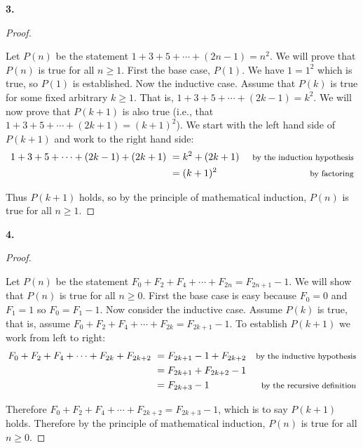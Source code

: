 \documentclass[10pt,]{book}
\theoremstyle{plain}
\theoremstyle{definition}
\theoremstyle{definition}
\theoremstyle{definition}
\numberwithin{equation}{chapter}
\newcommand{\amp}{ & }
\begin{document}
\par\smallskip
\noindent\textbf{3.}\quad{}\begin{proof}\hypertarget{proof-21}{}

Let \(P(n)\) be the statement \(1+3 +5 + \cdots + (2n-1) = n^2\). We will prove that \(P(n)\) is true for all \(n \ge 1\). First the base case, \(P(1)\). We have \(1 = 1^2\) which is true, so \(P(1)\) is established. Now the inductive case. Assume that \(P(k)\) is true for some fixed arbitrary \(k \ge 1\). That is, \(1 + 3 + 5 + \cdots + (2k-1) = k^2\). We will now prove that \(P(k+1)\) is also true (i.e., that \(1 + 3 + 5 + \cdots + (2k+1) = (k+1)^2\)). We start with the left hand side of \(P(k+1)\) and work to the right hand side:
\begin{align*}
  1 + 3 + 5 + \cdots + (2k-1) + (2k+1) ~ \amp  = k^2 + (2k+1) \amp  \mbox{ \footnotesize by the induction hypothesis}\\
  \amp  = (k+1)^2 \amp  \mbox{ \footnotesize by factoring}
\end{align*}
%
\par

Thus \(P(k+1)\) holds, so by the principle of mathematical induction, \(P(n)\) is true for all \(n \ge 1\).
%
\end{proof}
\par\smallskip
\noindent\textbf{4.}\quad{}\begin{proof}\hypertarget{proof-22}{}

Let \(P(n)\) be the statement \(F_0 + F_2 + F_4 + \cdots + F_{2n} = F_{2n+1} - 1\). We will show that \(P(n)\) is true for all \(n \ge 0\). First the base case is easy because \(F_0 = 0\) and \(F_1 = 1\) so \(F_0 = F_1 - 1\). Now consider the inductive case. Assume \(P(k)\) is true, that is, assume \(F_0 + F_2 + F_4 + \cdots + F_{2k} = F_{2k+1} - 1\). To establish \(P(k+1)\) we work from left to right:
\begin{align*}
  F_0 + F_2 + F_4 + \cdots + F_{2k} + F_{2k+2} ~ \amp  = F_{2k+1} - 1 + F_{2k+2} \amp  \mbox{\footnotesize by the inductive hypothesis}\\
  \amp  = F_{2k+1} + F_{2k+2} - 1 \amp\\
  \amp  = F_{2k+3} - 1 \amp  \mbox{\footnotesize by the recursive definition}
\end{align*}
%
\par

Therefore \(F_0 + F_2 + F_4 + \cdots + F_{2k+2} = F_{2k+3} - 1\), which is to say \(P(k+1)\) holds. Therefore by the principle of mathematical induction, \(P(n)\) is true for all \(n \ge 0\).
%
\end{proof}
\end{document}
